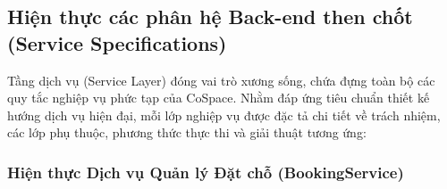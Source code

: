 \subsection{Hiện thực các phân hệ Back-end then chốt (Service Specifications)}

Tầng dịch vụ (Service Layer) đóng vai trò xương sống, chứa đựng toàn bộ các quy tắc nghiệp vụ phức tạp của CoSpace. Nhằm đáp ứng tiêu chuẩn thiết kế hướng dịch vụ hiện đại, mỗi lớp nghiệp vụ được đặc tả chi tiết về trách nhiệm, các lớp phụ thuộc, phương thức thực thi và giải thuật tương ứng:

\subsubsection{Hiện thực Dịch vụ Quản lý Đặt chỗ (BookingService)}

